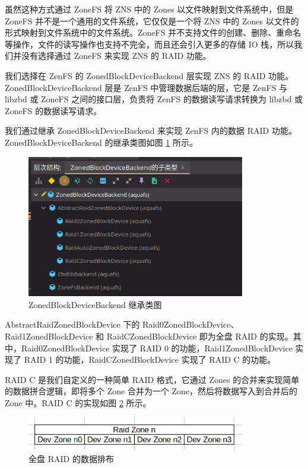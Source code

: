 虽然这种方式通过 ZoneFS 将 ZNS 中的 Zones 以文件映射到文件系统中，但是 ZoneFS 并不是一个通用的文件系统，它仅仅是一个将 ZNS 中的 Zones 以文件的形式映射到文件系统中的文件系统。ZoneFS 并不支持文件的创建、删除、重命名等操作，文件的读写操作也支持不完全，而且还会引入更多的存储 IO 栈，所以我们并没有选择通过 ZoneFS 来实现 ZNS 的 RAID 功能。

我们选择在 ZenFS 的 ZonedBlockDeviceBackend 层实现 ZNS 的 RAID 功能。ZonedBlockDeviceBackend 层是 ZenFS 中管理数据后端的层，它是 ZenFS 与 libzbd 或 ZoneFS 之间的接口层，负责将 ZenFS 的数据读写请求转换为 libzbd 或 ZoneFS 的数据读写请求。

我们通过继承 ZonedBlockDeviceBackend 来实现 ZenFS 内的数据 RAID 功能。ZonedBlockDeviceBackend 的继承类图如图 \ref{raid-layers} 所示。

\begin{figure}[htbp]
  \centering
  \includegraphics[width=0.85\textwidth]{fig/raid-layers}
  \caption{ ZonedBlockDeviceBackend 继承类图 }
  \label{raid-layers}
\end{figure}

AbstractRaidZonedBlockDevice 下的 Raid0ZonedBlockDevice、Raid1ZonedBlockDevice 和 RaidCZonedBlockDevice 即为全盘 RAID 的实现。其中，Raid0ZonedBlockDevice 实现了 RAID 0 的功能，Raid1ZonedBlockDevice 实现了 RAID 1 的功能，RaidCZonedBlockDevice 实现了 RAID C 的功能。

RAID C 是我们自定义的一种简单 RAID 格式，它通过 Zones 的合并来实现简单的数据拼合逻辑，即将多个 Zone 合并为一个 Zone，然后将数据写入到合并后的 Zone 中。RAID C 的实现如图 \ref{raid-c} 所示。

\begin{figure}[htbp]
  \centering
  \includegraphics[width=0.85\textwidth]{fig/raid-c}
  \caption{ 全盘 RAID 的数据排布 }
  \label{raid-c}
\end{figure}

